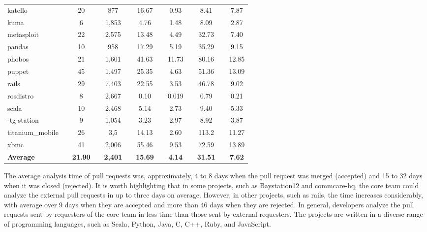 \documentclass{sig-alternate}
\begin{document}
\begin{table}[htb]
\begin{tabular}{@{}l@{} p{0.1cm} @{}c@{} p{0.07cm} @{}c@{} p{0.07cm} @{}c@{} p{0.07cm} @{}c@{} p{0.07cm}@{}c@{} @{}l@{} @{}c@{}}
katello          &  & 20  &  & 877   &  & 16.67 &  & 0.93  &  & 8.41  &  & 7.87  \\
kuma             &  & 6   &  & 1,853 &  & 4.76  &  & 1.48  &  & 8.09  &  & 2.87  \\
metasploit       &  & 22  &  & 2,575 &  & 13.48 &  & 4.49  &  & 32.73 &  & 7.40  \\
pandas           &  & 10  &  & 958   &  & 17.29 &  & 5.19  &  & 35.29 &  & 9.15  \\
phobos           &  & 21  &  & 1,601 &  & 41.63 &  & 11.73 &  & 80.16 &  & 12.85 \\
puppet           &  & 45  &  & 1,497 &  & 25.35 &  & 4.63  &  & 51.36 &  & 13.09 \\
rails            &  & 29  &  & 7,403 &  & 22.55 &  & 3.53  &  & 46.78 &  & 9.02  \\
rosdistro        &  & 8   &  & 2,667 &  & 0.10  &  & 0.019 &  & 0.79  &  & 0.21  \\
scala            &  & 10  &  & 2,468 &  & 5.14  &  & 2.73  &  & 9.40  &  & 5.33  \\
-tg-station      &  & 9   &  & 1,054 &  & 3.23  &  & 2.97  &  & 8.92  &  & 3.87  \\
titanium\_mobile &  & 26  &  & 3,5   &  & 14.13 &  & 2.60  &  & 113.2 &  & 11.27 \\
xbmc             &  & 41  &  & 2,006 &  & 55.46 &  & 9.53  &  & 72.59 &  & 13.89 \\ \hline
\textbf{Average} &  & \textbf{21.90} &  & \textbf{2,401} &  & \textbf{15.69} &  & \textbf{4.14} &  & \textbf{31.51} &  & \textbf{7.62} \\ \hline
\end{tabular}
\end{table}

The average analysis time of pull requests was, approximately, 4 to 8 days when the pull request was merged (accepted) and 15 to 32 days when it was closed (rejected). It is worth highlighting that in some projects, such as Baystation12 and commcare-hq, the core team could analyze the external pull requests in up to three days on average. However, in other projects, such as rails, the time increases considerably, with average over 9 days when they are accepted and more than 46 days when they are rejected. In general, developers analyze the pull requests sent by requesters of the core team in less time than those sent by external requesters. The projects are written in a diverse range of programming languages, such as Scala, Python, Java, C, C++, Ruby, and JavaScript.
\end{document}
